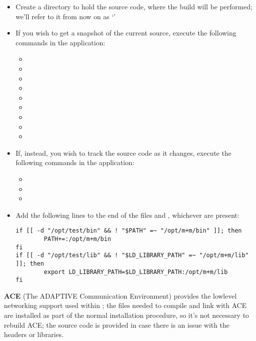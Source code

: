 \begin{itemize}
\item Create a directory to hold the source code, where the build will be performed; we'll
refer to it from now on as `'
\item\exSp{}If you wish to get a snapshot of the current source, execute the following
commands in the  application:
\begin{itemize}
\item {}
\item\exSp{}
\item\exSp{}
\item\exSp{}
\item\exSp{}
\item\exSp{}
\item\exSp{}
\item\exSp{}
\item\exSp{}
\end{itemize}
\item\exSp{}If, instead, you wish to track the source code as it changes, execute the
following commands in the  application:
\begin{itemize}
\item {}
\item\exSp{}
\item\exSp{}
\end{itemize}
\item\exSp{}Add the following lines to the end of the files
 and ,
whichever are present:
\begin{verbatim}
if [[ -d "/opt/test/bin" && ! "$PATH" =~ "/opt/m+m/bin" ]]; then
        PATH+=:/opt/m+m/bin
fi
if [[ -d "/opt/test/lib" && ! "$LD_LIBRARY_PATH" =~ "/opt/m+m/lib" ]]; then
        export LD_LIBRARY_PATH=$LD_LIBRARY_PATH:/opt/m+m/lib
fi
\end{verbatim}
\end{itemize}
\tertiaryEnd
\secondaryEnd
{}
\textbf{ACE} (The ADAPTIVE Communication Environment) provides the low\longDash{}level
networking support used within \mplusm{}; the files needed to compile and link with ACE
are installed as part of the normal \mplusm{} installation procedure, so it's not
necessary to rebuild ACE; the source code is provided in case there is an issue with the
headers or libraries.\\

